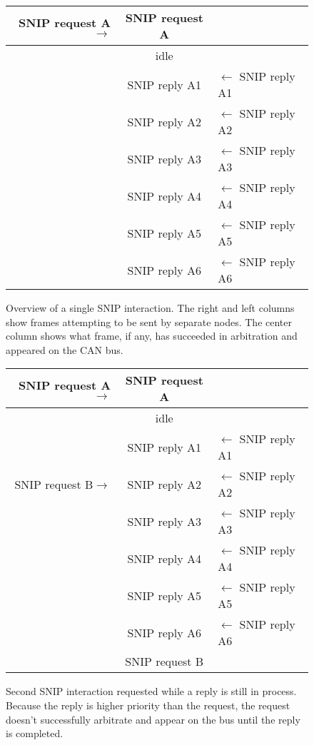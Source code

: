 \documentclass[11pt]{article}
\begin{document}
\begin{figure}[!htbp]
\begin{center}
\begin{tabular}{ r | c | l}
\hline
SNIP request A$\rightarrow$ & SNIP request A& \\ \hline

    & idle & \\ \hline

    & SNIP reply A1  & $\leftarrow$ SNIP reply A1 \\ \hline
    & SNIP reply A2  & $\leftarrow$ SNIP reply A2 \\ \hline
    & SNIP reply A3  & $\leftarrow$ SNIP reply A3 \\ \hline
    & SNIP reply A4  & $\leftarrow$ SNIP reply A4 \\ \hline
    & SNIP reply A5  & $\leftarrow$ SNIP reply A5 \\ \hline
    & SNIP reply A6  & $\leftarrow$ SNIP reply A6 \\ 
\hline
\end{tabular}
\end{center}
\caption{Overview of a single SNIP interaction. The right and left 
columns show frames attempting to be sent by separate nodes. 
The center column shows what frame, if any, 
has succeeded in arbitration and appeared on the CAN bus.}
\label{fig:single_SNIP_interaction}
\end{figure}


\begin{figure}[!htbp]
\begin{center}
\begin{tabular}{ r | c | l}
\hline
SNIP request A$\rightarrow$ & SNIP request A& \\ \hline

    & idle & \\ \hline

    & SNIP reply A1  & $\leftarrow$ SNIP reply A1 \\ \hline
SNIP request B$\rightarrow$ & SNIP reply A2  & $\leftarrow$ SNIP reply A2 \\ \hline
    & SNIP reply A3  & $\leftarrow$ SNIP reply A3 \\ \hline
    & SNIP reply A4  & $\leftarrow$ SNIP reply A4 \\ \hline
    & SNIP reply A5  & $\leftarrow$ SNIP reply A5 \\ \hline
    & SNIP reply A6  & $\leftarrow$ SNIP reply A6 \\ \hline
    & SNIP request B & \\ \hline
\end{tabular}
\end{center}
\caption{Second SNIP interaction requested while a reply is still in process.
Because the reply is higher priority than the request, the request doesn't
successfully arbitrate and appear on the bus until the reply is completed.}
\label{fig:normal_double_SNIP_interaction}
\end{figure}
\end{document}
